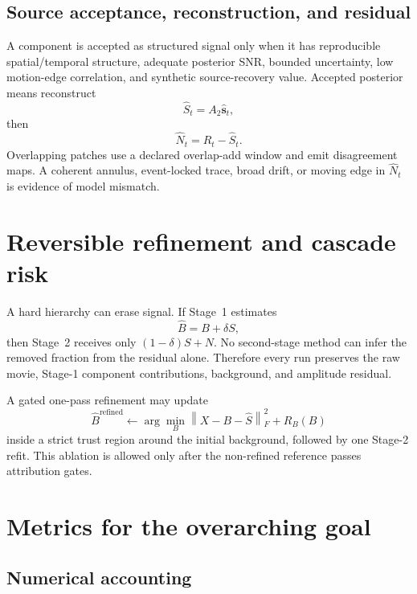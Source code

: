 \documentclass[11pt]{article}
\newcommand{\norm}[1]{\left\lVert #1\right\rVert}
\newcommand{\Bhat}{\widehat B}
\newcommand{\Shat}{\widehat S}
\newcommand{\Nhat}{\widehat N}
\begin{document}
\subsection{Source acceptance, reconstruction, and residual}

A component is accepted as structured signal only when it has reproducible
spatial/temporal structure, adequate posterior SNR, bounded uncertainty, low
motion-edge correlation, and synthetic source-recovery value. Accepted posterior
means reconstruct
\begin{equation}
\Shat_t=A_2\widehat{\bm s}_t,
\end{equation}
then
\begin{equation}
\Nhat_t=R_t-\Shat_t.
\label{eq:noise-candidate}
\end{equation}
Overlapping patches use a declared overlap-add window and emit disagreement maps.
A coherent annulus, event-locked trace, broad drift, or moving edge in \(\Nhat_t\)
is evidence of model mismatch.

\section{Reversible refinement and cascade risk}

A hard hierarchy can erase signal. If Stage~1 estimates
\begin{equation}
\Bhat=B+\delta S,
\end{equation}
then Stage~2 receives only \((1-\delta)S+N\). No second-stage method can infer the
removed fraction from the residual alone. Therefore every run preserves the raw
movie, Stage-1 component contributions, background, and amplitude residual.

A gated one-pass refinement may update
\begin{equation}
\Bhat^{\mathrm{refined}}
\leftarrow
\arg\min_B\norm{X-B-\Shat}_F^2+R_B(B)
\end{equation}
inside a strict trust region around the initial background, followed by one
Stage-2 refit. This ablation is allowed only after the non-refined reference
passes attribution gates.

\section{Metrics for the overarching goal}

\subsection{Numerical accounting}
\end{document}
